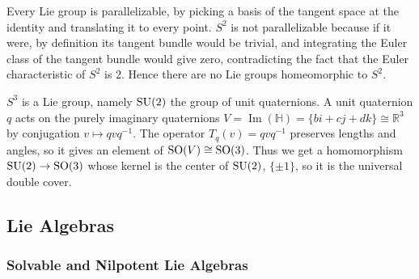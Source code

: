 \documentclass[12pt]{article}
\begin{document}
\begin{solution}
    Every Lie group is parallelizable, by picking a basis of the tangent space at the identity and translating it to every point. $S^2$ is not parallelizable because if it were, by definition its tangent bundle would be trivial, and integrating the Euler class of the tangent bundle would give zero, contradicting the fact that the Euler characteristic of $S^2$ is 2. Hence there are no Lie groups homeomorphic to $S^2$.
\end{solution}

\begin{example}
    $S^3$ is a Lie group, namely $\operatorname{SU}(2)$ the group of unit quaternions.
    A unit quaternion $q$ acts on the purely imaginary quaternions
    $V = \operatorname{Im}(\mathbb H)=\{bi+cj+dk\}\cong \mathbb R^3$
    by conjugation $v \mapsto qvq^{-1}$.
    The operator $T_q(v)=qvq^{-1}$ preserves lengths and angles, so it gives an element of $\operatorname{SO}(V) \cong \operatorname{SO}(3)$. Thus we get a homomorphism $\operatorname{SU}(2) \to \operatorname{SO}(3)$
    whose kernel is the center of $\operatorname{SU}(2)$, $\{\pm 1\}$, so it is the universal double cover.
\end{example}


\subsection{Lie Algebras}
\subsubsection{Solvable and Nilpotent Lie Algebras}
\end{document}
